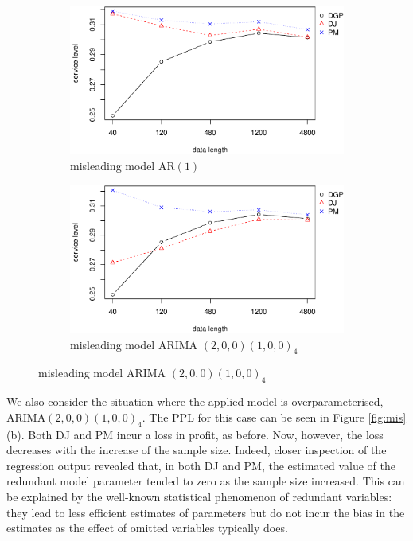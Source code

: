 \documentclass{article}
\begin{document}
\begin{figure}
\centering
\caption{Service level vs. data size in misleading model}
\begin{subfigure}[b]{0.48\textwidth}
\centering
\includegraphics[width=\textwidth]{information-plot_files/figure-latex/AR(1)sl-1.pdf}
\caption{misleading model AR$(1)$}
\end{subfigure}
\hfill
\begin{subfigure}[b]{0.48\textwidth}
\centering
\includegraphics[width=\textwidth]{information-plot_files/figure-latex/SAR(3)(1)_4sl-1.pdf}
\caption{misleading model ARIMA $(2,0,0)(1,0,0)_4$}
\end{subfigure}
\label{fig:mis_sl}
\end{figure}

We also consider the situation where the applied model is overparameterised, ARIMA$(2,0,0)(1,0,0)_4$. The PPL for this case can be seen in Figure \ref{fig:mis} (b). Both DJ and PM incur a loss in profit, as before. Now, however, the loss decreases with the increase of the sample size. Indeed, closer inspection of the regression output revealed that, in both DJ and PM, the estimated value of the redundant model parameter tended to zero as the sample size increased. This can be explained by the well-known statistical phenomenon of redundant variables: they lead to less efficient estimates of parameters but do not incur the bias in the estimates as the effect of omitted variables typically does.
\end{document}
